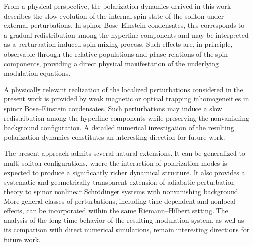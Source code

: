 \documentclass[11pt]{amsart}
\theoremstyle{definition}
\numberwithin{equation}{section}
\begin{document}
From a physical perspective, the polarization dynamics derived in this work describes the slow evolution of the internal spin state of the soliton under external perturbations. In spinor Bose--Einstein condensates, this corresponds to a gradual redistribution among the hyperfine components and may be interpreted as a perturbation-induced spin-mixing process. Such effects are, in principle, observable through the relative populations and phase relations of the spin components, providing a direct physical manifestation of the underlying modulation equations.

A physically relevant realization of the localized perturbations considered in the present work is provided by weak magnetic or optical trapping inhomogeneities in spinor Bose--Einstein condensates. Such perturbations may induce a slow redistribution among the hyperfine components while preserving the nonvanishing background configuration. A detailed numerical investigation of the resulting polarization dynamics constitutes an interesting direction for future work.

The present approach admits several natural extensions. It can be generalized to multi-soliton configurations, where the interaction of polarization modes is expected to produce a significantly richer dynamical structure. It also provides a systematic and geometrically transparent extension of adiabatic perturbation theory to spinor nonlinear Schr\"odinger systems with nonvanishing background. More general classes of perturbations, including time-dependent and nonlocal effects, can be incorporated within the same Riemann--Hilbert setting. The analysis of the long-time behavior of the resulting modulation system, as well as its comparison with direct numerical simulations, remain interesting directions for future work.


\end{document}
